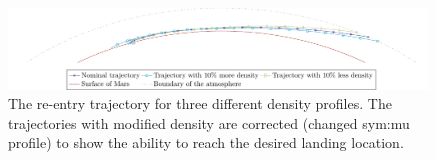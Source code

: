 \begin{figure}[h]
	\centering
	\includegraphics[width=0.99\textwidth]{Figure/Orbit/entry_mars.pdf}
	\caption{The re-entry trajectory for three different density profiles. The trajectories with modified density are corrected (changed \gls{sym:mu} profile) to show the ability to reach the desired landing location.}
	\label{fig:entry_mars}
\end{figure}

\begin{figure}
	\centering


\end{figure}
